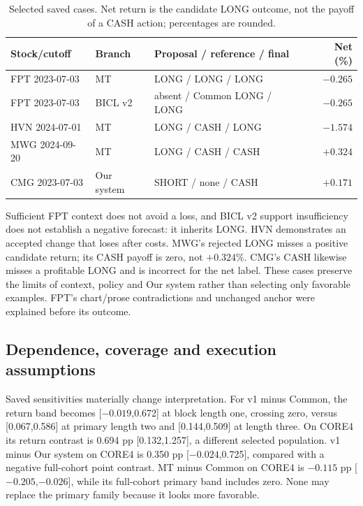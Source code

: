 \begin{table}[!htb]\centering\small{}\setlength{\tabcolsep}{4pt}
\caption[Selected adverse and policy cases]{Selected saved cases. Net return is the candidate LONG outcome,
not the payoff of a CASH action; percentages are rounded.}\label{tab:cases}
\begin{tabular}{@{}P{.25\linewidth}P{.23\linewidth}P{.29\linewidth}r@{}}\toprule
Stock/cutoff & Branch & Proposal / reference / final & Net (\%)\\\midrule
FPT 2023-07-03 & MT & LONG / LONG / LONG & $-0.265$\\
FPT 2023-07-03 & BICL v2 & absent / Common LONG / LONG & $-0.265$\\
HVN 2024-07-01 & MT & LONG / CASH / LONG & $-1.574$\\
MWG 2024-09-20 & MT & LONG / CASH / CASH & $+0.324$\\
CMG 2023-07-03 & Our system & SHORT / none / CASH & $+0.171$\\\bottomrule
\end{tabular}\end{table}

Sufficient FPT context does not avoid a loss, and BICL v2 support insufficiency
does not establish a negative forecast: it inherits LONG. HVN demonstrates
an accepted change that loses after costs. MWG's rejected LONG misses a
positive candidate return; its CASH payoff is zero, not $+0.324$\%.
CMG's CASH likewise misses a profitable LONG and is incorrect for the
net label. These cases preserve the limits of context, policy and Our system
rather than selecting only favorable examples. FPT's chart/prose
contradictions and unchanged anchor were explained before its outcome.

\subsection{Dependence, coverage and execution assumptions}
Saved sensitivities materially change interpretation. For v1 minus Common,
the return band becomes [$-0.019$,0.672] at block length one, crossing zero,
versus [0.067,0.586] at primary length two and [0.144,0.509] at length three.
On CORE4 its return contrast is 0.694 pp [0.132,1.257], a different selected
population. v1 minus Our system on CORE4 is 0.350 pp [$-0.024$,0.725], compared
with a negative full-cohort point contrast. MT minus Common on CORE4 is
$-0.115$ pp [$-0.205$,$-0.026$], while its full-cohort primary band includes
zero. None may replace the primary family because it looks more favorable.

